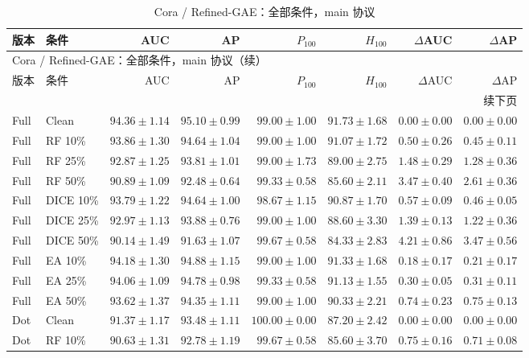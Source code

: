 {\footnotesize
\setlength{\tabcolsep}{3.2pt}
\renewcommand{\arraystretch}{1.10}
\begin{longtable}{llrrrrrr}
\caption{Cora / Refined-GAE：全部条件，main 协议}\\
\toprule
版本 & 条件 & AUC & AP & $P_{100}$ & $H_{100}$ & $\Delta$AUC & $\Delta$AP \\
\midrule
\endfirsthead
\multicolumn{8}{l}{Cora / Refined-GAE：全部条件，main 协议（续）}\\
\toprule
版本 & 条件 & AUC & AP & $P_{100}$ & $H_{100}$ & $\Delta$AUC & $\Delta$AP \\
\midrule
\endhead
\midrule\multicolumn{8}{r}{续下页}\\
\endfoot
\bottomrule
\endlastfoot
Full & Clean & $94.36\pm1.14$ & $95.10\pm0.99$ & $99.00\pm1.00$ & $91.73\pm1.68$ & $0.00\pm0.00$ & $0.00\pm0.00$ \\
Full & RF 10\% & $93.86\pm1.30$ & $94.64\pm1.04$ & $99.00\pm1.00$ & $91.07\pm1.72$ & $0.50\pm0.26$ & $0.45\pm0.11$ \\
Full & RF 25\% & $92.87\pm1.25$ & $93.81\pm1.01$ & $99.00\pm1.73$ & $89.00\pm2.75$ & $1.48\pm0.29$ & $1.28\pm0.36$ \\
Full & RF 50\% & $90.89\pm1.09$ & $92.48\pm0.64$ & $99.33\pm0.58$ & $85.60\pm2.11$ & $3.47\pm0.40$ & $2.61\pm0.36$ \\
Full & DICE 10\% & $93.79\pm1.22$ & $94.64\pm1.00$ & $98.67\pm1.15$ & $90.87\pm1.70$ & $0.57\pm0.09$ & $0.46\pm0.05$ \\
Full & DICE 25\% & $92.97\pm1.13$ & $93.88\pm0.76$ & $99.00\pm1.00$ & $88.60\pm3.30$ & $1.39\pm0.13$ & $1.22\pm0.36$ \\
Full & DICE 50\% & $90.14\pm1.49$ & $91.63\pm1.07$ & $99.67\pm0.58$ & $84.33\pm2.83$ & $4.21\pm0.86$ & $3.47\pm0.56$ \\
Full & EA 10\% & $94.18\pm1.30$ & $94.88\pm1.15$ & $99.00\pm1.00$ & $91.33\pm1.68$ & $0.18\pm0.17$ & $0.21\pm0.17$ \\
Full & EA 25\% & $94.06\pm1.09$ & $94.78\pm0.98$ & $99.33\pm0.58$ & $91.13\pm1.55$ & $0.30\pm0.05$ & $0.31\pm0.11$ \\
Full & EA 50\% & $93.62\pm1.37$ & $94.35\pm1.11$ & $99.00\pm1.00$ & $90.33\pm2.21$ & $0.74\pm0.23$ & $0.75\pm0.13$ \\
Dot & Clean & $91.37\pm1.17$ & $93.48\pm1.11$ & $100.00\pm0.00$ & $87.20\pm2.42$ & $0.00\pm0.00$ & $0.00\pm0.00$ \\
Dot & RF 10\% & $90.63\pm1.31$ & $92.78\pm1.19$ & $99.67\pm0.58$ & $85.60\pm3.70$ & $0.75\pm0.16$ & $0.71\pm0.08$ \\

\end{longtable}}
